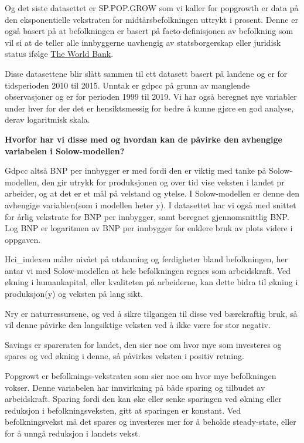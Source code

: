 \documentclass[
  12pt,
  a4paper,
  DIV=11,
  numbers=noendperiod]{scrartcl}
\begin{document}
Og det siste datasettet er SP.POP.GROW som vi kaller for popgrowth er
data på den eksponentielle vekstraten for midtårsbefolkningen uttrykt i
prosent. Denne er også basert på at befolkningen er basert på
facto-definisjonen av befolkning som vil si at de teller alle
innbyggerne uavhengig av statsborgerskap eller juridisk status ifølge
\href{https://databank.worldbank.org/metadataglossary/all/series?search=SP.POP.GROW}{The
World Bank}.

Disse datasettene blir slått sammen til ett datasett basert på landene
og er for tidsperioden 2010 til 2015. Unntak er gdpcc på grunn av
manglende observasjoner og er for perioden 1999 til 2019. Vi har også
beregnet nye variabler under hver for der det er hensiktsmessig for
bedre å kunne gjøre en god analyse, derav logaritmisk skala.

\textbf{Hvorfor har vi disse med og hvordan kan de påvirke den avhengige
variabelen i Solow-modellen?}

Gdpcc altså BNP per innbygger er med fordi den er viktig med tanke på
Solow-modellen, den gir utrykk for produksjonen og over tid vise veksten
i landet pr arbeider, og at det er et mål på velstand og ytelse. I
Solow-modellen er denne den avhengige variablen(som i modellen heter y).
I datasettet har vi også med snittet for årlig vekstrate for BNP per
innbygger, samt beregnet gjennomsnittlig BNP. Log BNP er logaritmen av
BNP per innbygger for enklere bruk av plots videre i oppgaven.

Hci\_indexen måler nivået på utdanning og ferdigheter bland
befolkningen, her antar vi med Solow-modellen at hele befolkningen
regnes som arbeidskraft. Ved økning i humankapital, eller kvaliteten på
arbeiderne, kan dette bidra til økning i produksjon(y) og veksten på
lang sikt.

Nry er naturressursene, og ved å sikre tilgangen til disse ved
bærekraftig bruk, så vil denne påvirke den langsiktige veksten ved å
ikke være for stor negativ.

Savings er spareraten for landet, den sier noe om hvor mye som
investeres og spares og ved økning i denne, så påvirkes veksten i
positiv retning.

Popgrowt er befolknings-vekstraten som sier noe om hvor mye befolkningen
vokser. Denne variabelen har innvirkning på både sparing og tilbudet av
arbeidskraft. Sparing fordi den kan øke eller senke sparingen ved økning
eller reduksjon i befolkningsveksten, gitt at sparingen er konstant. Ved
befolkningsvekst må det spares og investeres mer for å beholde
steady-state, eller for å unngå reduksjon i landets vekst.
\end{document}
